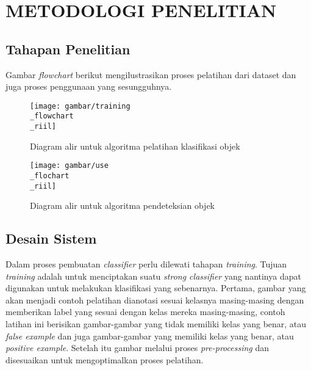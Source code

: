 
\chapter{METODOLOGI PENELITIAN}

\section{Tahapan Penelitian}

Gambar \textit{flowchart} berikut mengilustrasikan proses pelatihan 
 dari dataset dan juga proses penggunaan yang sesungguhnya.

\begin{figure}[H]
  \centering{}
	\texttt{[image: gambar/training\\\_flowchart\\\_riil]}
  \caption{Diagram alir untuk algoritma pelatihan klasifikasi objek}
\end{figure}

\begin{figure}[H]
  \centering{}
	\texttt{[image: gambar/use\\\_flochart\\\_riil]}
  \caption{Diagram alir untuk algoritma pendeteksian objek}
\end{figure}


\section{Desain Sistem}

Dalam proses pembuatan \emph{classifier} perlu dilewati tahapan \textit{training}. 
Tujuan \textit{training} adalah untuk menciptakan suatu \emph{strong classifier} 
yang nantinya dapat digunakan untuk melakukan klasifikasi yang sebenarnya.
Pertama, gambar yang akan menjadi contoh pelatihan dianotasi sesuai kelasnya masing-masing dengan 
memberikan label yang sesuai dengan kelas mereka masing-masing, 
contoh latihan ini berisikan gambar-gambar yang tidak memiliki kelas yang benar, atau 
\emph{false example} dan juga gambar-gambar yang memiliki kelas yang benar, atau 
\emph{positive example}. Setelah itu gambar melalui proses \emph{pre-processing} dan disesuaikan 
untuk mengoptimalkan proses pelatihan.


